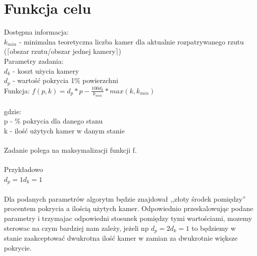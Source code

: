 \documentclass[12pt,a4paper]{article}
\begin{document}
\section{Funkcja celu}
Dostępna informacja: \\
\footnotesize
$k_{min}$ - minimalna teoretyczna liczba kamer dla aktualnie rozpatrywanego rzutu \\ \indent ($\lceil$obszar rzutu/obszar jednej kamery$\rceil$) \\
\normalsize
%
\newline
Parametry zadania: \\
$d_k$ - koszt użycia kamery \\
$d_p$ - wartość pokrycia 1\% powierzchni\\
\newline
Funkcja:
$f(p, k) = d_p*p - \frac{100d_k}{k_{min}}*max(k,k_{min}) $ \\ \\
gdzie: \\
p - \% pokrycia dla danego stanu \\
k - ilość użytych kamer w danym stanie \\ \\
Zadanie polega na maksymalizacji funkcji f. \\ \\ 
Przykładowo \\
$ d_p = 1 d_k = 1$ \\ \\ 
Dla podanych parametrów algorytm będzie znajdował ,,złoty środek pomiędzy'' 
procentem pokrycia a ilością użytych kamer.
Odpowiednio przeskalowując podane parametry i trzymajac odpowiedni 
stosunek pomiędzy tymi wartościami,
mozemy sterowac na czym bardziej nam zależy, jeżeli np 
$d_p = 2d_k = 1 $ to będziemy w stanie zaakceptować dwukrotna 
ilość kamer w zamian za dwukrotnie większe pokrycie.
%
\end{document}
